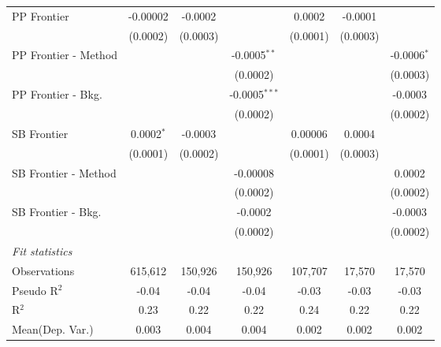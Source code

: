 \begin{tabular}{lcccccc}
   PP Frontier          & -0.00002      & -0.0002       &                 & 0.0002        & -0.0001       &   \\   
                        & (0.0002)      & (0.0003)      &                 & (0.0001)      & (0.0003)      &   \\   
   PP Frontier - Method &               &               & -0.0005$^{**}$  &               &               & -0.0006$^{*}$\\   
                        &               &               & (0.0002)        &               &               & (0.0003)\\   
   PP Frontier - Bkg.   &               &               & -0.0005$^{***}$ &               &               & -0.0003\\   
                        &               &               & (0.0002)        &               &               & (0.0002)\\   
   SB Frontier          & 0.0002$^{*}$  & -0.0003       &                 & 0.00006       & 0.0004        &   \\   
                        & (0.0001)      & (0.0002)      &                 & (0.0001)      & (0.0003)      &   \\   
   SB Frontier - Method &               &               & -0.00008        &               &               & 0.0002\\   
                        &               &               & (0.0002)        &               &               & (0.0002)\\   
   SB Frontier - Bkg.   &               &               & -0.0002         &               &               & -0.0003\\   
                        &               &               & (0.0002)        &               &               & (0.0002)\\   
   \midrule
   \emph{Fit statistics}\\
   Observations         & 615,612       & 150,926       & 150,926         & 107,707       & 17,570        & 17,570\\  
   Pseudo R$^2$         & -0.04         & -0.04         & -0.04           & -0.03         & -0.03         & -0.03\\  
   R$^2$                & 0.23          & 0.22          & 0.22            & 0.24          & 0.22          & 0.22\\  
Mean(Dep. Var.) & 0.003 & 0.004 & 0.004 & 0.002 & 0.002 & 0.002 \\
   

\end{tabular}
